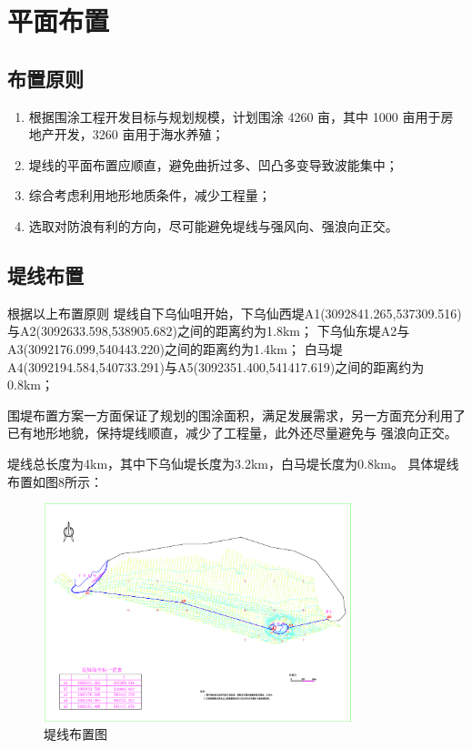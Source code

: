 \documentclass[UTF8, a4paper, 12pt]{ctexart} %
\begin{document}
\section{平面布置}
\subsection{布置原则}
\par
\begin{enumerate}
    \item 根据围涂工程开发目标与规划规模，计划围涂 4260 亩，其中 1000 亩用于房地产开发，3260 亩用于海水养殖；
    \item 堤线的平面布置应顺直，避免曲折过多、凹凸多变导致波能集中；
    \item 综合考虑利用地形地质条件，减少工程量；
    \item 选取对防浪有利的方向，尽可能避免堤线与强风向、强浪向正交。
\end{enumerate}

\subsection{堤线布置}
根据以上布置原则
堤线自下乌仙咀开始，下乌仙西堤A1(3092841.265,537309.516)与A2(3092633.598,538905.682)之间的距离约为1.8km；
下乌仙东堤A2与A3(3092176.099,540443.220)之间的距离约为1.4km；
白马堤A4(3092194.584,540733.291)与A5(3092351.400,541417.619)之间的距离约为0.8km；
\par
围堤布置方案一方面保证了规划的围涂面积，满足发展需求，另一方面充分利用了
已有地形地貌，保持堤线顺直，减少了工程量，此外还尽量避免与
强浪向正交。

堤线总长度为4km，其中下乌仙堤长度为3.2km，白马堤长度为0.8km。
具体堤线布置如图8所示：
\begin{figure}[h]
    \centering
    \includegraphics[width=0.8\textwidth]{10.png}
    \caption{堤线布置图}
    \label{fig:sea_dike_layout}
\end{figure}
\end{document}
